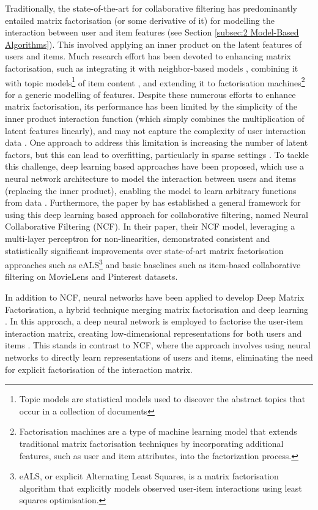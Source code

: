 Traditionally, the state-of-the-art for collaborative filtering has predominantly entailed matrix factorisation (or some derivative of it) for modelling the interaction between user and item features (see Section \ref{subsec:2 Model-Based Algorithms}). This involved applying an inner product on the latent features of users and items. Much research effort has been devoted to enhancing matrix factorisation, such as integrating it with neighbor-based models \cite{koren2008factorization}, combining it with topic models\footnote{Topic models are statistical models used to discover the abstract topics that occur in a collection of documents} of item content \cite{wang2015collaborative}, and extending it to factorisation machines\footnote{Factorisation machines are a type of machine learning model that extends traditional matrix factorisation techniques by incorporating additional features, such as user and item attributes, into the factorization process.} \cite{rendle2010factorization} for a generic modelling of features. Despite these numerous efforts to enhance matrix factorisation, its performance has been limited by the simplicity of the inner product interaction function (which simply combines the multiplication of latent features linearly), and may not capture the complexity of user interaction data \cite{he2017neural}. One approach to address this limitation is increasing the number of latent factors, but this can lead to overfitting, particularly in sparse settings \cite{rendle2010factorization}. To tackle this challenge, deep learning based approaches have  been proposed, which use a neural network architecture to model the interaction between users and items (replacing the inner product), enabling the model to learn arbitrary functions from data \cite{he2017neural}. Furthermore, the paper by \cite{he2017neural} has established a general framework for using this deep learning based approach for collaborative filtering, named Neural Collaborative Filtering (NCF). In their paper, their NCF model, leveraging a multi-layer perceptron for non-linearities, demonstrated consistent and statistically significant improvements over state-of-art matrix factorisation approaches such as eALS\footnote{eALS, or explicit Alternating Least Squares, is a matrix factorisation algorithm that explicitly models observed user-item interactions using least squares optimisation.} and basic baselines such as item-based collaborative filtering on MovieLens and Pinterest datasets. 

In addition to NCF, neural networks have been applied to develop Deep Matrix Factorisation, a hybrid technique merging matrix factorisation and deep learning \cite{zhang2019deep}. In this approach, a deep neural network is employed to factorise the user-item interaction matrix, creating low-dimensional representations for both users and items \cite{zhang2019deep}. This stands in contrast to NCF, where the approach involves using neural networks to directly learn representations of users and items, eliminating the need for explicit factorisation of the interaction matrix. 


